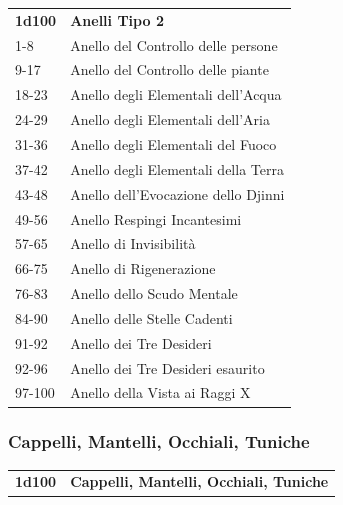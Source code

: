 \begin{multicols}{2}
	\begin{tabular}{ll}
		\textbf{1d100} & \textbf{Anelli Tipo 2}\\
		1-8 &  Anello del Controllo delle persone\\
		9-17&  Anello del Controllo delle piante\\
		18-23& Anello degli Elementali dell'Acqua\\
		24-29& Anello degli Elementali dell'Aria\\
		31-36& Anello degli Elementali del Fuoco\\
		37-42& Anello degli Elementali della Terra\\
		43-48& Anello dell'Evocazione dello Djinni\\
		49-56& Anello Respingi Incantesimi\\
		57-65& Anello di Invisibilità\\
		66-75& Anello di Rigenerazione\\
		76-83& Anello dello Scudo Mentale\\
		84-90& Anello delle Stelle Cadenti\\
		91-92& Anello dei Tre Desideri\\
		92-96& Anello dei Tre Desideri esaurito\\
		97-100 & Anello della Vista ai Raggi X\\

	\end{tabular}


	\subsubsection{Cappelli, Mantelli, Occhiali, Tuniche}

	\begin{tabularx}{0.45\textwidth}{lX}
		\textbf{1d100} & \textbf{Cappelli, Mantelli, Occhiali, Tuniche}\\


\end{tabularx}
\end{multicols}
